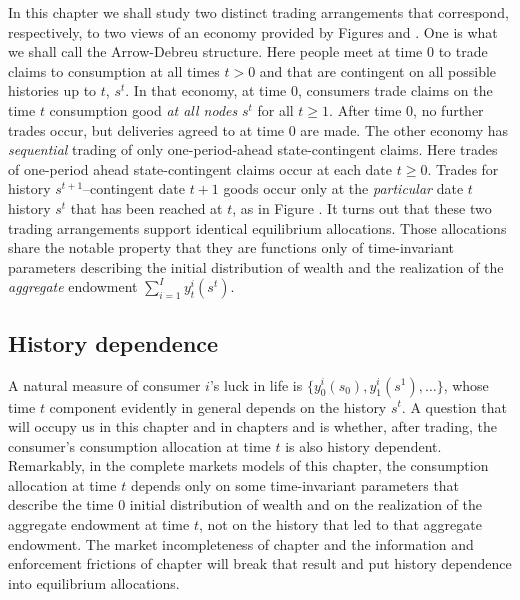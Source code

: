 In this chapter we shall study two distinct trading arrangements
that correspond, respectively,  to  two views of an economy provided by
Figures  and . %
One is
what we shall call the Arrow-Debreu structure.  Here  people meet
at time $0$ to  trade claims to consumption at all times $t >0$
and that are contingent on all possible histories up to $t$,
$s^t$. In that economy, at time $0$, consumers trade claims on
the time $t$ consumption good {\it at all nodes\/} $s^t$   for all $t \geq 1$. After
time $0$, no further trades occur, but deliveries agreed to at time $0$ are made.
     The other economy has {\it sequential\/} trading of
only one-period-ahead state-contingent claims. Here trades of one-period ahead state-contingent claims occur
at each date $t \geq 0$.   Trades for history
$s^{t+1}$--contingent date $t+1$ goods occur only at the {\it
particular\/}   date $t$ history $s^t$ that has been reached at
$t$, as in Figure .   %
 It turns out that  these two trading
arrangements support identical equilibrium allocations. 
Those
allocations share the notable property that they are  functions only of   time-invariant
parameters describing the initial distribution of wealth and  
the realization of
the {\it aggregate\/} endowment $\sum_{i=1}^I y_t^i(s^t)$.






\subsection{History dependence}
  A natural measure of consumer
$i$'s luck in life is  $\{y^i_0(s_0), y^i_1(s^1), \ldots \}$, whose time $t$ component
evidently in general depends on the history $s^t$. A
question that will occupy us in this chapter and in chapters
 and
 is whether, after trading, the consumer's
consumption allocation at time $t$ is also history dependent.  Remarkably, in
the complete markets models of this chapter, the consumption
allocation  at time $t$  depends only on some time-invariant parameters that describe the time $0$  initial distribution of wealth and
on the realization of the aggregate
endowment  at time $t$,  not  on the  history that led to that aggregate endowment.
 The market incompleteness of chapter
 and the  information and enforcement frictions of
chapter  will break that result and put
history dependence into equilibrium allocations.


